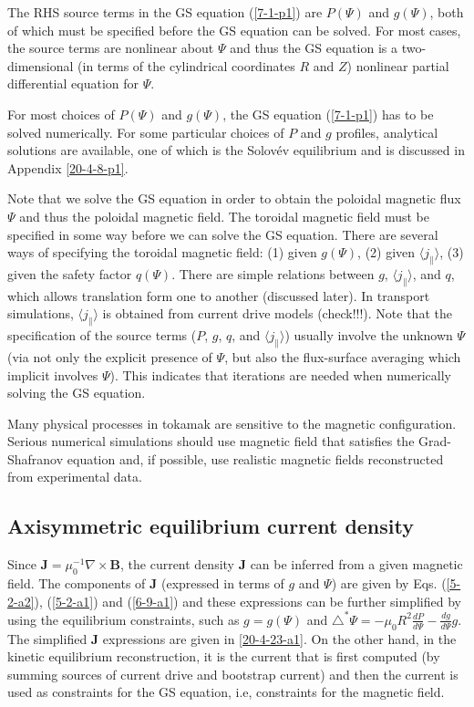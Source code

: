 \documentclass{article}
\begin{document}
The RHS source terms in the GS equation (\ref{7-1-p1}) are $P (\Psi)$ and $g
(\Psi)$, both of which must be specified before the GS equation can be solved.
For most cases, the source terms are nonlinear about $\Psi$ and thus the GS
equation is a two-dimensional (in terms of the cylindrical coordinates $R$ and
$Z$) nonlinear partial differential equation for $\Psi$.

For most choices of $P (\Psi)$ and $g (\Psi)$, the GS equation (\ref{7-1-p1})
has to be solved numerically. For some particular choices of $P$ and $g$
profiles, analytical solutions are available, one of which is the Solov{\'e}v
equilibrium and is discussed in Appendix \ref{20-4-8-p1}.

Note that we solve the GS equation in order to obtain the poloidal magnetic
flux $\Psi$ and thus the poloidal magnetic field. The toroidal magnetic field
must be specified in some way before we can solve the GS equation. There are
several ways of specifying the toroidal magnetic field: (1) given $g (\Psi)$,
(2) given $\langle j_{\parallel} \rangle$, (3) given the safety factor $q
(\Psi)$. There are simple relations between $g$, $\langle j_{\parallel}
\rangle$, and $q$, which allows translation form one to another (discussed
later). In transport simulations, $\langle j_{\parallel} \rangle$ is obtained
from current drive models (check!!!). Note that the specification of the
source terms ($P$, $g$, $q$, and $\langle j_{\parallel} \rangle$) usually
involve the unknown $\Psi$ (via not only the explicit presence of $\Psi$, but
also the flux-surface averaging which implicit involves $\Psi$). This
indicates that iterations are needed when numerically solving the GS equation.

Many physical processes in tokamak are sensitive to the magnetic
configuration. Serious numerical simulations should use magnetic field that
satisfies the Grad-Shafranov equation and, if possible, use realistic magnetic
fields reconstructed from experimental data.

\subsection{Axisymmetric equilibrium current density}

Since $\mathbf{J}= \mu_0^{- 1} \nabla \times \mathbf{B}$, the current density
$\mathbf{J}$ can be inferred from a given magnetic field. The components of
$\mathbf{J}$ (expressed in terms of $g$ and $\Psi$) are given by Eqs.
(\ref{5-2-a2}), (\ref{5-2-a1}) and (\ref{6-9-a1}) and these expressions can be
further simplified by using the equilibrium constraints, such as $g = g
(\Psi)$ and $\triangle^{\ast} \Psi = - \mu_0 R^2 \frac{d P}{d \Psi} - \frac{d
g}{d \Psi} g$. The simplified $\mathbf{J}$ expressions are given in
\ref{20-4-23-a1}. On the other hand, in the kinetic equilibrium
reconstruction{\cite{li2013}}, it is the current that is first computed (by
summing sources of current drive and bootstrap current) and then the current
is used as constraints for the GS equation, i.e, constraints for the magnetic
field.
\end{document}
